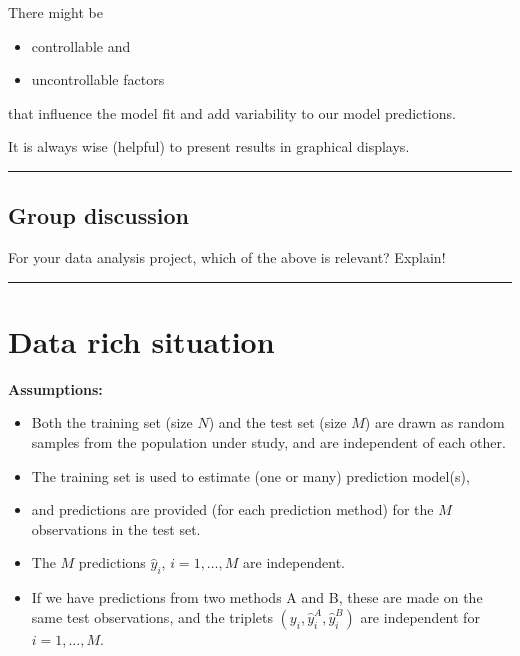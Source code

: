 \documentclass[
  letterpaper,
  DIV=11,
  numbers=noendperiod]{scrartcl}
\providecommand{\tightlist}{%
  \setlength{\itemsep}{0pt}\setlength{\parskip}{0pt}}\usepackage{longtable,booktabs,array}
\begin{document}
There might be

\begin{itemize}
\tightlist
\item
  controllable and
\item
  uncontrollable factors
\end{itemize}

that influence the model fit and add variability to our model
predictions.

It is always wise (helpful) to present results in graphical displays.

\begin{center}\rule{0.5\linewidth}{0.5pt}\end{center}

\hypertarget{group-discussion}{%
\subsection{Group discussion}\label{group-discussion}}

For your data analysis project, which of the above is relevant? Explain!

\begin{center}\rule{0.5\linewidth}{0.5pt}\end{center}

\hypertarget{data-rich-situation}{%
\section{Data rich situation}\label{data-rich-situation}}

\textbf{Assumptions:}

\begin{itemize}
\item
  Both the training set (size \(N\)) and the test set (size \(M\)) are
  drawn as random samples from the population under study, and are
  independent of each other.
\item
  The training set is used to estimate (one or many) prediction
  model(s),
\item
  and predictions are provided (for each prediction method) for the
  \(M\) observations in the test set.
\item
  The \(M\) predictions \(\hat{y}_i\), \(i=1,\ldots, M\) are
  independent.
\item
  If we have predictions from two methods A and B, these are made on the
  same test observations, and the triplets
  \((y_i,\hat{y}_i^A,\hat{y}_i^B)\) are independent for
  \(i=1,\ldots,M\).
\end{itemize}
\end{document}
